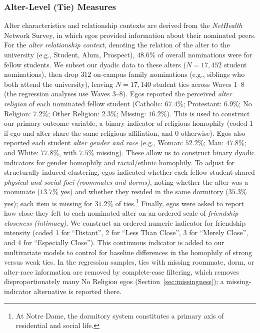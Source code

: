 \documentclass[11pt]{article}
\begin{document}
\subsubsection{Alter-Level (Tie) Measures}
Alter characteristics and relationship contexts are derived from the \textit{NetHealth} Network Survey, in which egos provided information about their nominated peers. For the \textit{alter relationship context}, denoting the relation of the alter to the university (e.g., Student, Alum, Prospect), $48.6\%$ of overall nominations were for fellow students. We subset our dyadic data to these alters ($N = 17{,}452$ student nominations), then drop $312$ on-campus family nominations (e.g., siblings who both attend the university), leaving $N = 17{,}140$ student ties across Waves 1--8 (the regression analyses use Waves 3--8). Egos reported the perceived \textit{alter religion} of each nominated fellow student (Catholic: $67.4\%$; Protestant: $6.9\%$; No Religion: $7.2\%$; Other Religion: $2.3\%$; Missing: $16.2\%$). This is used to construct our primary outcome variable, a binary indicator of religious homophily (coded $1$ if ego and alter share the same religious affiliation, and $0$ otherwise). Egos also reported each student \textit{alter gender and race} (e.g., Woman: $52.2\%$; Man: $47.8\%$; and White: $77.8\%$, with $7.5\%$ missing). These allow us to construct binary dyadic indicators for gender homophily and racial/ethnic homophily. To adjust for structurally induced clustering, egos indicated whether each fellow student shared \textit{physical and social foci (roommates and dorms)}, noting whether the alter was a roommate ($13.7\%$ yes) and whether they resided in the same dormitory ($35.3\%$ yes); each item is missing for $31.2\%$ of ties.\footnote{At Notre Dame, the dormitory system constitutes a primary axis of residential and social life.} Finally, egos were asked to report how close they felt to each nominated alter on an ordered scale of \textit{friendship closeness (intimacy)}. We construct an ordered numeric indicator for friendship intensity (coded 1 for ``Distant'', 2 for ``Less Than Close'', 3 for ``Merely Close'', and 4 for ``Especially Close''). This continuous indicator is added to our multivariate models to control for baseline differences in the homophily of strong versus weak ties. In the regression samples, ties with missing roommate, dorm, or alter-race information are removed by complete-case filtering, which removes disproportionately many No Religion egos (Section~\ref{sec:missingness}); a missing-indicator alternative is reported there.
\end{document}
